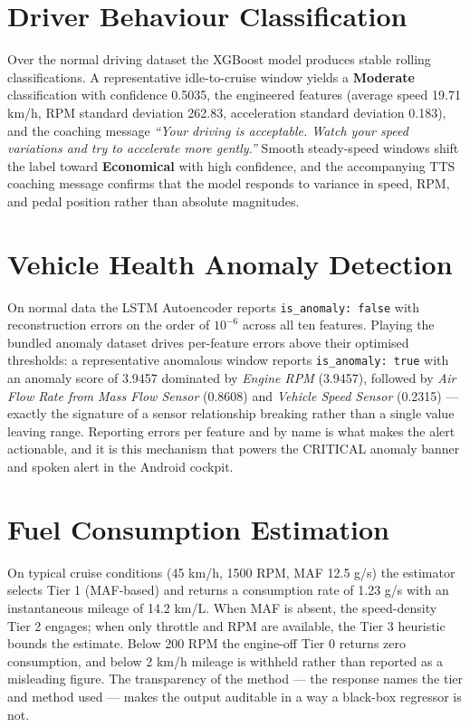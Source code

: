 \documentclass[10pt,a4paper]{report}
\begin{document}
\section{Driver Behaviour Classification}

Over the normal driving dataset the XGBoost model produces stable rolling classifications. A representative idle-to-cruise window yields a \textbf{Moderate} classification with confidence 0.5035, the engineered features (average speed 19.71 km/h, RPM standard deviation 262.83, acceleration standard deviation 0.183), and the coaching message \emph{``Your driving is acceptable. Watch your speed variations and try to accelerate more gently.''} Smooth steady-speed windows shift the label toward \textbf{Economical} with high confidence, and the accompanying TTS coaching message confirms that the model responds to variance in speed, RPM, and pedal position rather than absolute magnitudes.

\section{Vehicle Health Anomaly Detection}

On normal data the LSTM Autoencoder reports \texttt{is\_anomaly: false} with reconstruction errors on the order of $10^{-6}$ across all ten features. Playing the bundled anomaly dataset drives per-feature errors above their optimised thresholds: a representative anomalous window reports \texttt{is\_anomaly: true} with an anomaly score of 3.9457 dominated by \textit{Engine RPM} (3.9457), followed by \textit{Air Flow Rate from Mass Flow Sensor} (0.8608) and \textit{Vehicle Speed Sensor} (0.2315) — exactly the signature of a sensor relationship breaking rather than a single value leaving range. Reporting errors per feature and by name is what makes the alert actionable, and it is this mechanism that powers the CRITICAL anomaly banner and spoken alert in the Android cockpit.

\section{Fuel Consumption Estimation}

On typical cruise conditions (45 km/h, 1500 RPM, MAF 12.5 g/s) the estimator selects Tier 1 (MAF-based) and returns a consumption rate of 1.23 g/s with an instantaneous mileage of 14.2 km/L. When MAF is absent, the speed-density Tier 2 engages; when only throttle and RPM are available, the Tier 3 heuristic bounds the estimate. Below 200 RPM the engine-off Tier 0 returns zero consumption, and below 2 km/h mileage is withheld rather than reported as a misleading figure. The transparency of the method — the response names the tier and method used — makes the output auditable in a way a black-box regressor is not.
\end{document}
